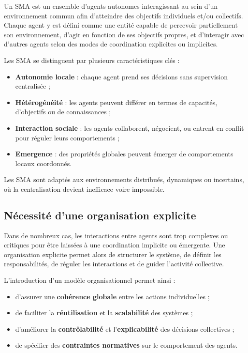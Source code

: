 Un \ac{SMA} est un ensemble d'agents autonomes interagissant au sein d'un environnement commun afin d'atteindre des objectifs individuels et/ou collectifs. Chaque agent y est défini comme une entité capable de percevoir partiellement son environnement, d'agir en fonction de ses objectifs propres, et d'interagir avec d'autres agents selon des modes de coordination explicites ou implicites.

Les \ac{SMA} se distinguent par plusieurs caractéristiques clés : 
\begin{itemize}
    \item \textbf{Autonomie locale} : chaque agent prend ses décisions sans supervision centralisée ;
    \item \textbf{Hétérogénéité} : les agents peuvent différer en termes de capacités, d'objectifs ou de connaissances ;
    \item \textbf{Interaction sociale} : les agents collaborent, négocient, ou entrent en conflit pour réguler leurs comportements ;
    \item \textbf{Emergence} : des propriétés globales peuvent émerger de comportements locaux coordonnés.
\end{itemize}

Les \ac{SMA} sont adaptés aux environnements distribués, dynamiques ou incertains, où la centralisation devient inefficace voire impossible.

\subsection{Nécessité d'une organisation explicite}

Dans de nombreux cas, les interactions entre agents sont trop complexes ou critiques pour être laissées à une coordination implicite ou émergente. Une organisation explicite permet alors de structurer le système, de définir les responsabilités, de réguler les interactions et de guider l'activité collective. 

L'introduction d'un modèle organisationnel permet ainsi :
\begin{itemize}
    \item d'assurer une \textbf{cohérence globale} entre les actions individuelles ;
    \item de faciliter la \textbf{réutilisation} et la \textbf{scalabilité} des systèmes ;
    \item d'améliorer la \textbf{contrôlabilité} et l'\textbf{explicabilité} des décisions collectives ;
    \item de spécifier des \textbf{contraintes normatives} sur le comportement des agents.
\end{itemize}


